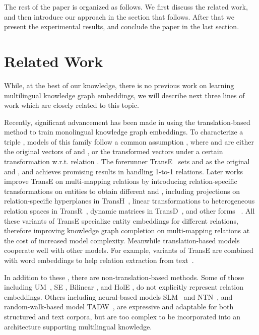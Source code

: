 \documentclass{article}
\def\inv{\vspace{-0.1cm}}
\begin{document}
The rest of the paper is organized as follows. We first discuss the related work, and then introduce our approach in the section that follows. After that we present the experimental results, and conclude the paper in the last section.


\newcommand{\stitle}[1]{\vspace{0.3ex}\noindent{\bf #1}}

\inv
\section{Related Work} \label{sec:related}



While, at the best of our knowledge, there is no previous work on learning multilingual knowledge graph embeddings, we will describe next three lines of work which are closely related to this topic.\par

\stitle{Knowledge Graph Embeddings.} Recently, significant advancement has been made in using the translation-based method to train monolingual knowledge graph embeddings. To characterize a triple , models of this family follow a common assumption ,
where  and  are either the original vectors of  and , or the transformed vectors under a certain transformation w.r.t. relation .
The forerunner
TransE~\cite{bordes2013translating} sets  and  as the original  and ,
and achieves promising results in handling 1-to-1 relations. Later works improve TransE on multi-mapping relations by introducing
relation-specific transformations on entities
to obtain different  and , including projections on relation-specific hyperplanes in TransH~\cite{wang2014knowledge},
linear transformations to heterogeneous relation spaces in TransR~\cite{lin2015learning}, dynamic matrices in TransD~\cite{ji2015knowledge}, and other forms
~\cite{jia2016locally,nguyenstranse}.
All these variants of TransE specialize
entity embeddings for different relations,
therefore improving knowledge graph completion on multi-mapping relations at the cost of increased model complexity. Meanwhile translation-based models cooperate well with other models. For example, variants of TransE are combined with word embeddings to help relation extraction from text~\cite{westonconnecting,zhong2015aligning}. \par

In addition to these
, there are
non-translation-based methods. Some of those including UM~\cite{bordes2011learning}, SE \cite{bordes2012joint}, Bilinear \cite{jenatton2012latent}, and HolE \cite{nickel2016holographic}, do not explicitly represent relation embeddings.
Others including neural-based models SLM~\cite{collobert2008unified} and NTN~\cite{socher2013reasoning}, and random-walk-based model {TADW}~\cite{yang2015network}, are expressive and adaptable for both structured and text corpora, but are too complex to be incorporated into an architecture supporting
multilingual knowledge.
\par
\end{document}
